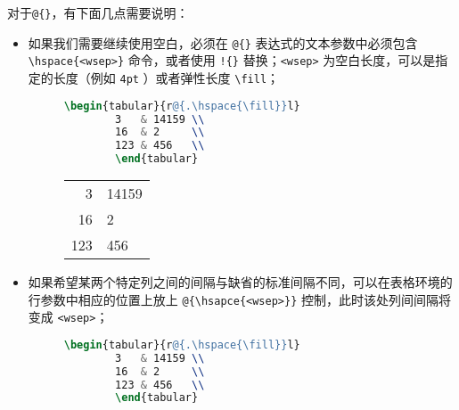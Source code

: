 \begin{enumerate}
    对于\verb|@{}|，有下面几点需要说明：
    \begin{itemize}
        \item 如果我们需要继续使用空白，必须在 \verb|@{}| 表达式的文本参数中必须包含 \verb|\hspace{<wsep>}| 命令，或者使用 \verb|!{}| 替换；\verb|<wsep>| 为空白长度，可以是指定的长度（例如 \verb|4pt| ）或者弹性长度 \verb|\fill|；
        \begin{figure}[!hpbt]
        \begin{minipage}{0.5\textwidth}
        \begin{lstlisting}[language=tex]
        \begin{tabular}{r@{.\hspace{\fill}}l}
        3   & 14159 \\
        16  & 2     \\
        123 & 456   \\
        \end{tabular}
        \end{lstlisting}%
        \end{minipage}
        \begin{minipage}{0.45\textwidth}
        \centering
        \begin{tabular}{r@{.\hspace{\fill}}l}
        3   & 14159 \\
        16  & 2     \\
        123 & 456   \\
        \end{tabular}
        \end{minipage}
        \end{figure}
        \item 如果希望某两个特定列之间的间隔与缺省的标准间隔不同，可以在表格环境的行参数中相应的位置上放上 \verb|@{\hsapce{<wsep>}}| 控制，此时该处列间间隔将变成 \verb|<wsep>|；
        \begin{figure}[!hpbt]
        \begin{minipage}{0.5\textwidth}
        \begin{lstlisting}[language=tex]
        \begin{tabular}{r@{.\hspace{\fill}}l}
        3   & 14159 \\
        16  & 2     \\
        123 & 456   \\
        \end{tabular}
        \end{lstlisting}%

\end{minipage}
\end{figure}
\end{itemize}
\end{enumerate}
